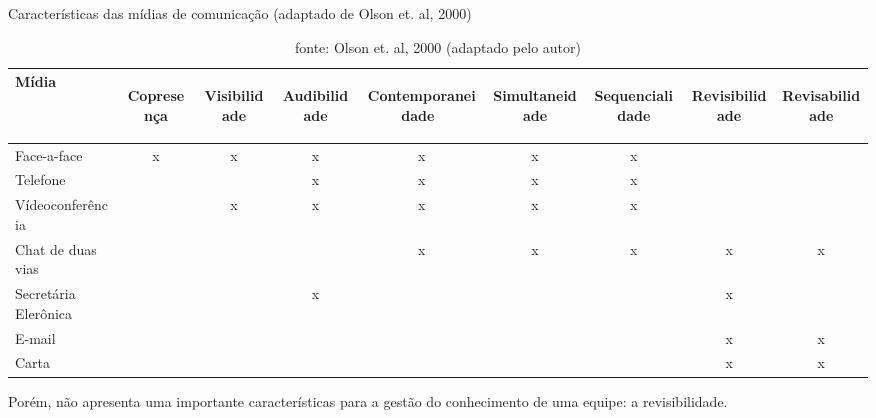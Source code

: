 \begin{table}[]
\centering
\caption{Características das mídias de comunicação (adaptado de Olson et. al, 2000)}
\label{my-label}
\begin{tabular}{l|c|c|c|c|c|c|c|c}
\hline
Mídia                & \begin{turn}{90}Copresença\end{turn} &\begin{turn}{90} Visibilidade\end{turn} & \begin{turn}{90}Audibilidade\end{turn} & \begin{turn}{90}Contemporaneidade \, \end{turn} & \begin{turn}{90}Simultaneidade\end{turn} & \begin{turn}{90}Sequencialidade\end{turn} &\begin{turn}{90}Revisibilidade\end{turn} & \begin{turn}{90}Revisabilidade\end{turn} \\ \hline
Face-a-face          &   x     &      x        &    x          &          x        &        x        &         x    &                &                \\ \hline
Telefone             &           &       &     x         &           x        &         x       &         x        &                &                \\ \hline
Vídeoconferência     &        &       x   &          x    &       x            &         x       &       x          &                &                \\ \hline
Chat de duas vias    &                                 &                                   &              &           x        &          x      &        x         &        x        &          x      \\ \hline
Secretária Elerônica &                                 &                                   &     x         &                   &                &                 &        x        &                \\ \hline
E-mail               &                                 &                                   &              &                   &                &                 &      x          &     x           \\ \hline
Carta                &                                 &                                   &              &                   &                &                 &       x         &       x         \\ \hline
\end{tabular}
\caption*{fonte: Olson et. al, 2000 (adaptado pelo autor)}
\end{table}
Porém, não apresenta uma importante características para a gestão do conhecimento de uma equipe: a revisibilidade.

